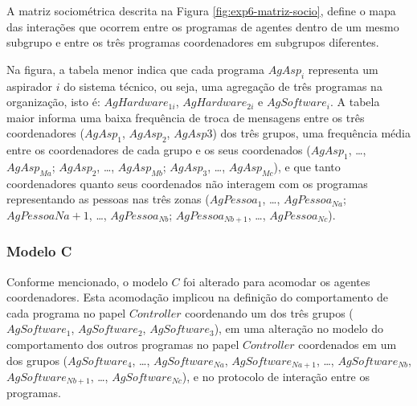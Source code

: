 A matriz sociométrica descrita na Figura \ref{fig:exp6-matriz-socio}, define o mapa das interações que ocorrem entre os programas de agentes dentro de um mesmo subgrupo e entre os três programas coordenadores em subgrupos diferentes. 


\begin{figure}[h!]
    \centering
\end{figure}

Na figura, a tabela menor indica que cada programa $AgAsp_i$ representa um aspirador $i$ do sistema técnico, ou seja, uma agregação de três programas na organização, isto é: $AgHardware_{1i}$, $AgHardware_{2i}$ e $AgSoftware_i$. A tabela maior informa uma baixa frequência de troca de mensagens entre os três coordenadores ($AgAsp_1$, $AgAsp_2$, $AgAsp3$) dos três grupos, uma frequência média entre os coordenadores de cada grupo e os seus coordenados ($AgAsp_1$, \ldots, $AgAsp_{Ma}$; $AgAsp_2$,  \ldots, $AgAsp_{Mb}$; $AgAsp_3$, \ldots, $AgAsp_{Mc}$), e que tanto coordenadores quanto seus coordenados não interagem com os programas representando as pessoas nas três zonas ($AgPessoa_1$, \ldots, $AgPessoa_{Na}$; $AgPessoa{Na+1}$, \ldots, $AgPessoa_{Nb}$; $AgPessoa_{Nb+1}$, \ldots, $AgPessoa_{Nc}$).

\subsubsection{Modelo C}

Conforme mencionado, o modelo $C$ foi alterado para acomodar os agentes coordenadores. Esta acomodação implicou na definição do comportamento de cada programa no papel $Controller$ coordenando um dos três grupos ($AgSoftware_1$, $AgSoftware_2$, $AgSoftware_3$), em uma alteração no modelo do comportamento dos outros programas no papel $Controller$ coordenados em um dos grupos ($AgSoftware_4$, \ldots, $AgSoftware_{Na}$, $AgSoftware_{Na+1}$, \ldots, $AgSoftware_{Nb}$, $AgSoftware_{Nb+1}$, \ldots, $AgSoftware_{Nc}$), e no protocolo de interação entre os programas.

